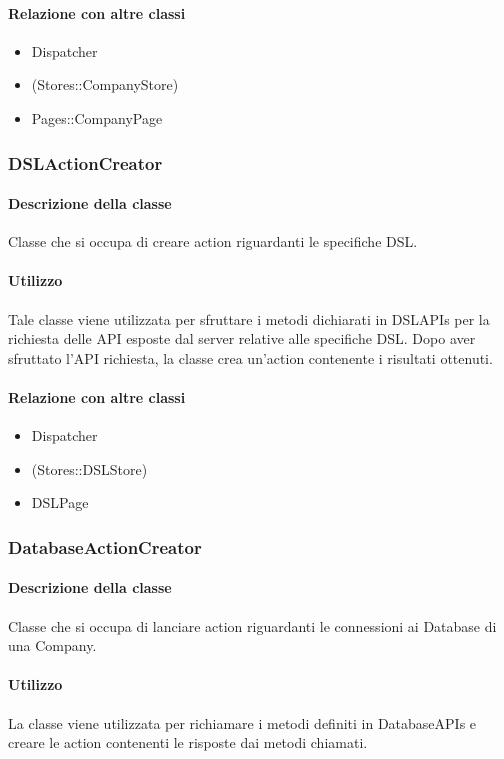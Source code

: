 \paragraph*{Relazione con altre classi}
\begin{itemize}
\item Dispatcher
\item (Stores::CompanyStore)
\item Pages::CompanyPage
\end{itemize}

\subsubsection{DSLActionCreator}
\paragraph*{Descrizione della classe}
Classe che si occupa di creare action riguardanti le specifiche DSL.
\paragraph*{Utilizzo}
Tale classe viene utilizzata per sfruttare i metodi dichiarati in DSLAPIs per la richiesta delle API esposte dal server relative alle specifiche DSL. Dopo aver sfruttato l'API richiesta, la classe crea un'action contenente i risultati ottenuti.

\paragraph*{Relazione con altre classi}
\begin{itemize}
\item Dispatcher
\item (Stores::DSLStore)
\item DSLPage
\end{itemize}

\subsubsection{DatabaseActionCreator}
\paragraph*{Descrizione della classe}
Classe che si occupa di lanciare action riguardanti le connessioni ai Database di una Company.
\paragraph*{Utilizzo}
La classe viene utilizzata per richiamare i metodi definiti in DatabaseAPIs e creare le action contenenti le risposte dai metodi chiamati.
